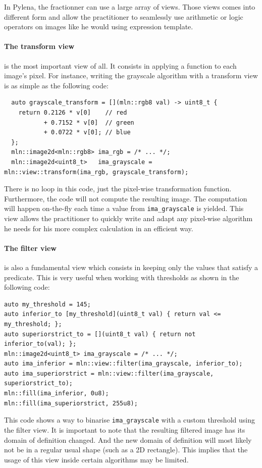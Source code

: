 In Pylena, the fractionner can use a large array of views. Those views comes into different form and allow the
practitioner to seamlessly use arithmetic or logic operators on images like he would using expression template.

\paragraph{The transform view} is the most important view of all. It consists in applying a function to each image's
pixel. For instance, writing the grayscale algorithm with a transform view is as simple as the following code:
\begin{verbatim}
  auto grayscale_transform = [](mln::rgb8 val) -> uint8_t {
    return 0.2126 * v[0]    // red
           + 0.7152 * v[0]  // green
           + 0.0722 * v[0]; // blue
  };
  mln::image2d<mln::rgb8> ima_rgb = /* ... */;
  mln::image2d<uint8_t>   ima_grayscale = mln::view::transform(ima_rgb, grayscale_transform);
\end{verbatim}
There is no loop in this code, just the pixel-wise transformation function. Furthermore, the code will not compute the
resulting image. The computation will happen on-the-fly each time a value from \texttt{ima\_grayscale} is yielded.
This view allows the practitioner to quickly write and adapt any pixel-wise algorithm he needs for his more complex
calculation in an efficient way.

\paragraph{The filter view} is also a fundamental view which consists in keeping only the values that satisfy a
predicate. This is very useful when working with thresholds as shown in the following code:
\begin{verbatim}
auto my_threshold = 145;
auto inferior_to [my_threshold](uint8_t val) { return val <= my_threshold; };
auto superiorstrict_to = [](uint8_t val) { return not inferior_to(val); };
mln::image2d<uint8_t> ima_grayscale = /* ... */;
auto ima_inferior = mln::view::filter(ima_grayscale, inferior_to);
auto ima_superiorstrict = mln::view::filter(ima_grayscale, superiorstrict_to);
mln::fill(ima_inferior, 0u8);
mln::fill(ima_superiorstrict, 255u8);
\end{verbatim}
This code shows a way to binarise \texttt{ima\_grayscale} with a custom threshold using the filter view. It is important
to note that the resulting filtered image has its domain of definition changed. And the new domain of definition will
most likely not be in a regular usual shape (such as a 2D rectangle). This implies that the usage of this view inside
certain algorithms may be limited.

